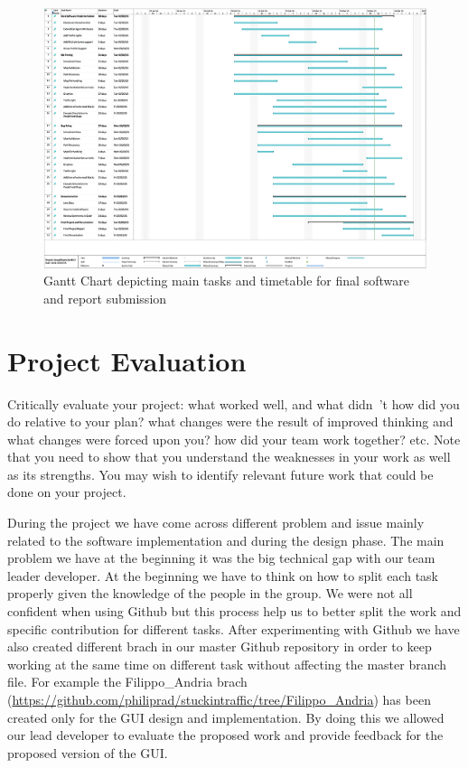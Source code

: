 \documentclass[oneside]{article}
\begin{document}
\newpage
\begin{figure}[h2]
\centering
\includegraphics[width=6.5in]{GroupProject_traffic3_Final}
\caption{Gantt Chart depicting main tasks and timetable for final software and report submission}
\end{figure}
\newpage

\section{Project Evaluation}

\noindent Critically evaluate your project: what worked well, and what didn\ 't how did you do relative to your plan? what changes were the result of improved thinking and what changes were forced upon you? how did your team work together? etc. Note that you need to show that you understand the weaknesses in your work as well as its strengths. You may wish to identify relevant future work that could be done on your project.
\newline

\noindent During the project we have come across different problem and issue mainly related to the software implementation and during the design phase. The main problem we have at the beginning it was the big technical gap with our team leader developer. At the beginning we have to think on how to split each task properly given the knowledge of the people in the group. We were not all confident when using Github but this process help us to better split the work and specific contribution for different tasks. After experimenting with Github we have also created different brach in our master Github repository in order to keep working at the same time on different task without affecting the master branch file. For example the Filippo\_Andria brach (\url{https://github.com/philiprad/stuckintraffic/tree/Filippo_Andria}) has been created only for the GUI design and implementation. By doing this we allowed our lead developer to evaluate the proposed work and provide feedback for the proposed version of the GUI. 
\newline
\end{document}
